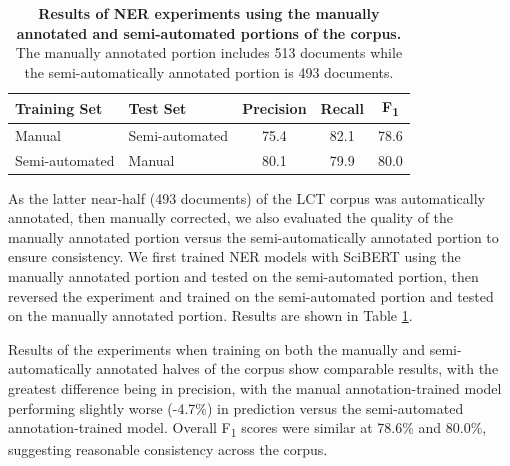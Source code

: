 \documentclass[../main.tex]{subfiles}
\begin{document}
\def\arraystretch{1.2}
\begin{table}[h!]
\centering
\begin{tabular}{l l c c c}
 \toprule
 \textbf{Training Set} & \textbf{Test Set} & \textbf{Precision} & \textbf{Recall} & \textbf{F\textsubscript{1}} \\
 \hline
    Manual & Semi-automated & 75.4 & 82.1 & 78.6 \\
    Semi-automated & Manual & 80.1 & 79.9 & 80.0 \\
 \hline
\end{tabular}
\caption{\textbf{Results of NER experiments using the manually annotated and semi-automated portions of the corpus.} The manually annotated portion includes 513 documents while the semi-automatically annotated portion is 493 documents.}
\label{tbl_manual_semiauto}
\end{table}

As the latter near-half (493 documents) of the LCT corpus was automatically annotated, then manually corrected, we also evaluated the quality of the manually annotated portion versus the semi-automatically annotated portion to ensure consistency. We first trained NER models with SciBERT using the manually annotated portion and tested on the semi-automated portion, then reversed the experiment and trained on the semi-automated portion and tested on the manually annotated portion. Results are shown in Table \ref{tbl_manual_semiauto}.

Results of the experiments when training on both the manually and semi-automatically annotated halves of the corpus show comparable results, with the greatest difference being in precision, with the manual annotation-trained model performing slightly worse (-4.7\%) in prediction versus the semi-automated annotation-trained model. Overall F\textsubscript{1} scores were similar at 78.6\% and 80.0\%, suggesting reasonable consistency across the corpus.
\end{document}
